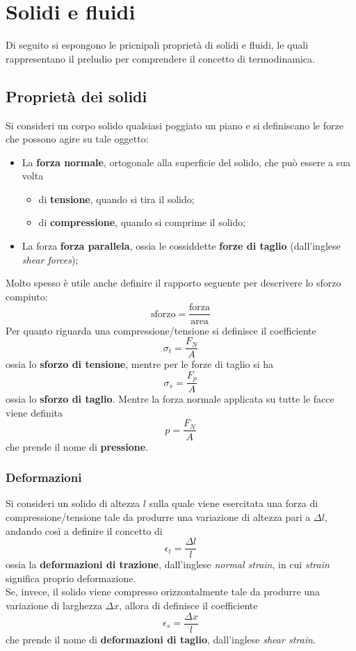 \documentclass[a4paper]{extarticle}
\begin{document}
\newpage
\section{Solidi e fluidi}
Di seguito si espongono le pricnipali proprietà di solidi e fluidi, le quali rappresentano il preludio per comprendere il concetto di termodinamica.

\vspace{1em}
\subsection{Proprietà dei solidi}
Si consideri un corpo solido qualsiasi poggiato un piano e si definiscano le forze che possono agire su tale oggetto:
\begin{itemize}
  \item La \textbf{forza normale}, ortogonale alla superficie del solido, che può essere a sua volta
  \begin{itemize}
    \item di \textbf{tensione}, quando si tira il solido;
    \item di \textbf{compressione}, quando si comprime il solido;
  \end{itemize}
  \item La forza \textbf{forza parallela}, ossia le cossiddette \textbf{forze di taglio} (dall'inglese \emph{shear forces});
\end{itemize}
Molto spesso è utile anche definire il rapporto seguente per descrivere lo sforzo compiuto:
\[\boxed{\text{sforzo} = \frac{\text{forza}}{\text{area}}}\]
Per quanto riguarda una compressione/tensione si definisce il coefficiente
\[\sigma_t = \frac{F_N}{A}\]
ossia lo \textbf{sforzo di tensione}, mentre per le forze di taglio si ha
\[\sigma_s=\frac{F_p}{A}\]
ossia lo \textbf{sforzo di taglio}. Mentre la forza normale applicata su tutte le facce viene definita
\[\boxed{p=\frac{F_N}{A}}\]
che prende il nome di \textbf{pressione}.

\vspace{1em}
\noindent
\subsubsection{Deformazioni}
Si consideri un solido di altezza $l$ sulla quale viene esercitata una forza di compressione/tensione tale da produrre una variazione di altezza pari a $\Delta l$, andando così a definire il concetto di
\[\epsilon_t=\frac{\Delta l}{l}\]
ossia la \textbf{deformazioni di trazione}, dall'inglese \emph{normal strain}, in cui \emph{strain} significa proprio deformazione.\\
Se, invece, il solido viene compresso orizzontalmente tale da produrre una variazione di larghezza $\Delta x$, allora di definisce il coefficiente
\[\epsilon_s = \frac{\Delta x}{l}\]
che prende il nome di \textbf{deformazioni di taglio}, dall'inglese \emph{shear strain}.
\end{document}
